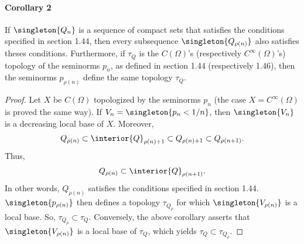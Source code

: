 \paragraph{Corollary 2}
If 
%
  $\singleton{Q_n}$ 
%
is a sequence of compact sets that satisfies the conditions specified 
in section 1.44, then every subsequence 
%
  $\singleton{Q_{\rho(n)}}$ 
%
also satisfies theses conditions.
%
Furthermore, if $\tau_{Q}$ is the $C(\Omega)$'s 
(respectively $C^\infty (\Omega)$'s) topology of the seminorms $p_{n}$, 
as defined in section 1.44 (respectively 1.46), then the seminorms 
%
  $p_{\rho(n)}$ 
%
define the same topology $\tau_{Q}$.
%
\begin{proof}%
%
Let $X$ be $C(\Omega)$ topologized by the seminorms $p_{n}$ 
(the case $X=C^\infty(\Omega)$ is proved the same way).
%
If 
    $V_{n} = \singleton{p_{n} < 1/n}$, 
then 
    $\singleton{V_{n}}$ 
is a decreasing local base of $X$.
%
Moreover,
% 
  \begin{align}
    Q_{\rho(n)} 
      \subset 
    \interior{Q}_{\rho(n) + 1} 
      \subset 
    Q_{\rho(n) + 1} 
      \subset 
    Q_{\rho(n+ 1)}.
  \end{align}
% 
Thus,
%
  \begin{align}
    Q_{\rho(n)} 
      \subset 
    \interior{Q}_{\rho(n+ 1)}.
  \end{align}
%
In other words, 
%
  $Q_{\rho(n)}$ satisfies the conditions specified in section 1.44.
%
%
  $\singleton{p_{\rho(n)}}$
% 
then defines a topology $\tau_{Q_\rho}$ for which  
% 
  $\singleton{V_{\rho(n)}}$ 
%
is a local base. So, 
% 
  $\tau_{Q_\rho} \subset \tau_{Q}$.
%
Conversely, the above corollary asserts that 
%
  $\singleton{V_{\rho(n)}}$ 
%
is a local base of $\tau_{Q}$, which yields  
%
  $\tau_{Q}\subset \tau_{Q_\rho}$.
%
\end{proof}
